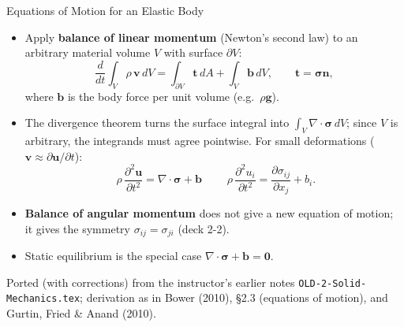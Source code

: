 \documentclass[aspectratio=169,11pt]{beamer}
\begin{document}
\begin{frame}{Equations of Motion for an Elastic Body}
  \begin{itemize}
    \item Apply \textbf{balance of linear momentum} (Newton's second law) to an arbitrary material volume $V$ with surface $\partial V$:
      \[
        \frac{d}{dt}\int_V \rho\,\mathbf{v}\,dV = \int_{\partial V} \mathbf{t}\,dA + \int_V \mathbf{b}\,dV ,
        \qquad \mathbf{t} = \boldsymbol{\sigma}\mathbf{n},
      \]
      where $\mathbf{b}$ is the body force per unit volume (e.g.\ $\rho\mathbf{g}$).
    \item The divergence theorem turns the surface integral into $\int_V \nabla\cdot\boldsymbol{\sigma}\,dV$; since $V$ is arbitrary, the integrands must agree pointwise. For small deformations ($\mathbf{v} \approx \partial\mathbf{u}/\partial t$):
      \[
        \boxed{\;\rho\,\frac{\partial^2 \mathbf{u}}{\partial t^2} = \nabla\cdot\boldsymbol{\sigma} + \mathbf{b}\;}
        \qquad
        \rho\,\frac{\partial^2 u_i}{\partial t^2} = \frac{\partial \sigma_{ij}}{\partial x_j} + b_i .
      \]
    \item \textbf{Balance of angular momentum} does not give a new equation of motion; it gives the symmetry $\sigma_{ij} = \sigma_{ji}$ (deck 2-2).
    \item Static equilibrium is the special case $\nabla\cdot\boldsymbol{\sigma} + \mathbf{b} = \mathbf{0}$.
  \end{itemize}
  \vspace{1mm}
  {\tiny\color{DarkGray}Ported (with corrections) from the instructor's earlier notes \texttt{OLD-2-Solid-Mechanics.tex}; derivation as in Bower (2010), \S2.3 (equations of motion), and Gurtin, Fried \& Anand (2010).\par}
\end{frame}
\end{document}
